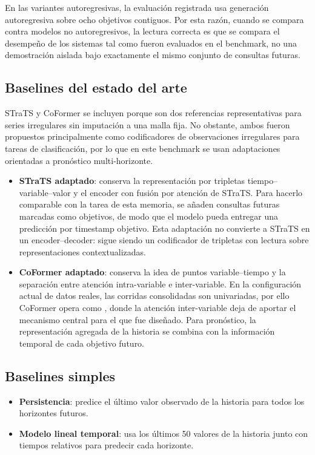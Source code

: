 En las variantes autoregresivas, la evaluación registrada usa generación autoregresiva sobre ocho objetivos contiguos. Por esta razón, cuando se compara contra modelos no autoregresivos, la lectura correcta es que se compara el desempeño de los sistemas tal como fueron evaluados en el benchmark, no una demostración aislada bajo exactamente el mismo conjunto de consultas futuras.

\subsection{Baselines del estado del arte}

STraTS y CoFormer se incluyen porque son dos referencias representativas para series irregulares sin imputación a una malla fija. No obstante, ambos fueron propuestos principalmente como codificadores de observaciones irregulares para tareas de clasificación, por lo que en este benchmark se usan adaptaciones orientadas a pronóstico multi-horizonte.

\begin{itemize}
	\item \textbf{STraTS adaptado}: conserva la representación por tripletas tiempo--variable--valor y el encoder con fusión por atención de STraTS. Para hacerlo comparable con la tarea de esta memoria, se añaden consultas futuras marcadas como objetivos, de modo que el modelo pueda entregar una predicción por timestamp objetivo. Esta adaptación no convierte a STraTS en un encoder--decoder: sigue siendo un codificador de tripletas con lectura sobre representaciones contextualizadas.
	\item \textbf{CoFormer adaptado}: conserva la idea de puntos variable--tiempo y la separación entre atención intra-variable e inter-variable. En la configuración actual de datos reales, las corridas consolidadas son univariadas, por ello CoFormer opera como , donde la atención inter-variable deja de aportar el mecanismo central para el que fue diseñado. Para pronóstico, la representación agregada de la historia se combina con la información temporal de cada objetivo futuro.
\end{itemize}

\subsection{Baselines simples}

\begin{itemize}
	\item \textbf{Persistencia}: predice el último valor observado de la historia para todos los horizontes futuros.
	\item \textbf{Modelo lineal temporal}: usa los últimos 50 valores de la historia junto con tiempos relativos para predecir cada horizonte.
\end{itemize}

